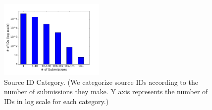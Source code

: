 \begin{figure}[t!]
\begin{center}
\includegraphics[width=2in]{figure/IDDistribution}
\caption{Source ID Category.
(We categorize source IDs according to the number of submissions they make.
Y axis represents the number of IDs in log scale for each category.)
}
\label{fig:iddis}
\end{center}
\end{figure}
